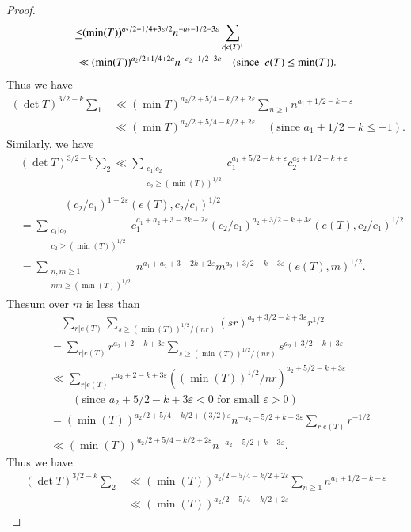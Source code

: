 \begin{proof}
\begin{align*}
&\underline{\leq}
    (\min(T))^{a_{2}/2+1/4+3\varepsilon/2}n^{-a_{2}-1/2-3\varepsilon}\sum_{r|e(T)^{1}}\\
&\ll (\min
    (T))^{a_{2}/2+1/4+2\varepsilon}n^{-a_{2}-1/2-3\varepsilon}\quad(\text{since
      \ } e(T)\leq \min(T)).
\end{align*}
Thus we have
\begin{align*}
(\det T)^{3/2-k}\sum_{1} &\ll (\min
  T)^{a_{2}/2+5/4-k/2+2\varepsilon}\sum_{n\geq
    1}n^{a_{1}+1/2-k-\varepsilon}\\
&\ll (\min T)^{a_{2}/2+5/4-k/2+2\varepsilon}\quad(\text{since \ }
  a_{1}+1/2-k\leq -1).
\end{align*}
Similarly, we have
\begin{align*}
& (\det T)^{3/2-k}\sum_{2}\ll \sum_{\substack{c_{1}|c_{2}\\ c_{2}\geq
      (\min
      (T))^{1/2}}}c_{1}^{a_{1}+5/2-k+\varepsilon}c_{2}^{a_{2}+1/2-k+\varepsilon}\\
&\qquad\qquad(c_{2}/c_{1})^{1+2\varepsilon}(e(T),c_{2}/c_{1})^{1/2}\\
&= \sum_{\substack{c_{1}|c_{2}\\ c_{2}\geq (\min
      (T))^{1/2}}}c_{1}^{a_{1}+a_{2}+3-2k+2\varepsilon}
(c_{2}/c_{1})^{a_{2}+3/2-k+3\varepsilon}(e(T),c_{2}/c_{1})^{1/2}\\
&= \sum_{\substack{n,m\geq 1 \\ nm\geq(\min
      (T))^{1/2}}}n^{a_{1}+a_{2}+3-2k+2\varepsilon}m^{a_{2}+3/2-k+3\varepsilon}(e(T),m)^{1/2}. 
\end{align*}
The\pageoriginale sum over $m$ is less than
\begin{align*}
&\quad \sum_{r|e(T)}\sum_{s\geq
    (\min(T))^{1/2}/(nr)}(sr)^{a_{2}+3/2-k+3\varepsilon}r^{1/2}\\
&= \sum_{r|e(T)}r^{a_{2}+2-k+3\varepsilon}\sum_{s\geq
    (\min(T))^{1/2}/(nr)}s^{a_{2}+3/2-k+3\varepsilon}\\
&\ll
  \sum_{r|e(T)}r^{a_{2}+2-k+3\varepsilon}((\min(T))^{1/2}/nr)^{a_{2}+5/2-k+3\varepsilon}\\ 
&\qquad (\text{since \ } a_{2}+5/2-k+3\varepsilon<0\text{ \ for small \ }
  \varepsilon>0)\\
&= (\min(T))^{a_{2}/2+5/4-k/2+(3/2)\varepsilon}
  n^{-a_{2}-5/2+k-3\varepsilon}\sum_{r|e(T)}r^{-1/2}\\
&\ll (\min(T))^{a_{2}/2+5/4-k/2+2\varepsilon}n^{-a_{2}-5/2+k-3\varepsilon}.
\end{align*}
Thus we have
\begin{align*}
(\det T)^{3/2-k}\sum_{2} &\ll (\min
  (T))^{a_{2}/2+5/4-k/2+2\varepsilon}\sum_{n\geq
    1}n^{a_{1}+1/2-k-\varepsilon}\\
&\ll (\min(T))^{a_{2}/2+5/4-k/2+2\varepsilon}
\end{align*}
\end{proof}

